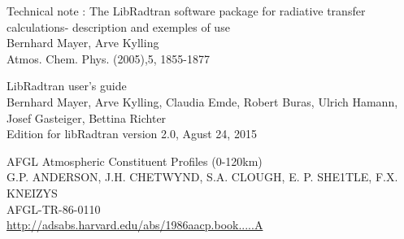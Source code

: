 \documentclass[a4paper]{article}
\begin{document}
\begin{thebibliography}{9}

Technical note : The LibRadtran software package for radiative transfer calculations- description and exemples of use\\
Bernhard Mayer, Arve Kylling\\
Atmos. Chem. Phys. (2005),5, 1855-1877
  
LibRadtran user's guide\\
Bernhard Mayer, Arve Kylling, Claudia Emde, Robert Buras, Ulrich Hamann, Josef Gasteiger, Bettina Richter \\
Edition for libRadtran version 2.0, Agust 24, 2015

AFGL Atmospheric Constituent Profiles (0-120km)\\
G.P. ANDERSON,  J.H. CHETWYND, S.A. CLOUGH, E. P. SHE1TLE, F.X. KNEIZYS \\
AFGL-TR-86-0110\\
\href{http://adsabs.harvard.edu/abs/1986aacp.book.....A}{http://adsabs.harvard.edu/abs/1986aacp.book.....A}

\end{thebibliography}
\end{document}
